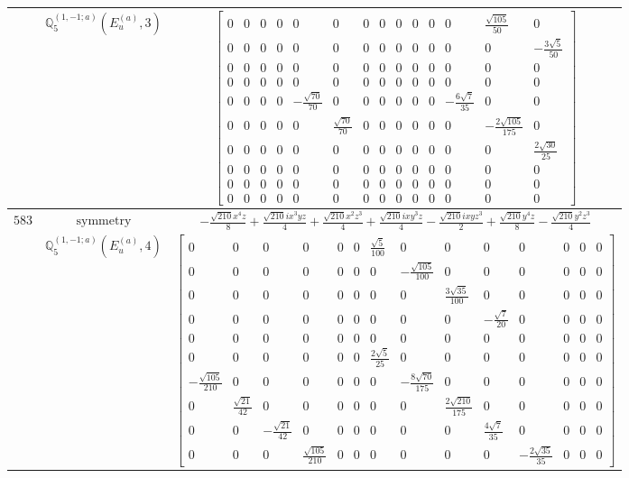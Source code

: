 \documentclass[fleqn,8pt,landscape]{jsarticle}
\begin{document}
\begin{longtable}{ccc}
$  $ & $ \mathbb{Q}_{5}^{(1,-1;a)}(E_{u}^{(a)},3) $ & $ \begin{bmatrix} 0 & 0 & 0 & 0 & 0 & 0 & 0 & 0 & 0 & 0 & 0 & 0 & \frac{\sqrt{105}}{50} & 0 \\ 0 & 0 & 0 & 0 & 0 & 0 & 0 & 0 & 0 & 0 & 0 & 0 & 0 & - \frac{3 \sqrt{5}}{50} \\ 0 & 0 & 0 & 0 & 0 & 0 & 0 & 0 & 0 & 0 & 0 & 0 & 0 & 0 \\ 0 & 0 & 0 & 0 & 0 & 0 & 0 & 0 & 0 & 0 & 0 & 0 & 0 & 0 \\ 0 & 0 & 0 & 0 & - \frac{\sqrt{70}}{70} & 0 & 0 & 0 & 0 & 0 & 0 & - \frac{6 \sqrt{7}}{35} & 0 & 0 \\ 0 & 0 & 0 & 0 & 0 & \frac{\sqrt{70}}{70} & 0 & 0 & 0 & 0 & 0 & 0 & - \frac{2 \sqrt{105}}{175} & 0 \\ 0 & 0 & 0 & 0 & 0 & 0 & 0 & 0 & 0 & 0 & 0 & 0 & 0 & \frac{2 \sqrt{30}}{25} \\ 0 & 0 & 0 & 0 & 0 & 0 & 0 & 0 & 0 & 0 & 0 & 0 & 0 & 0 \\ 0 & 0 & 0 & 0 & 0 & 0 & 0 & 0 & 0 & 0 & 0 & 0 & 0 & 0 \\ 0 & 0 & 0 & 0 & 0 & 0 & 0 & 0 & 0 & 0 & 0 & 0 & 0 & 0 \end{bmatrix} $ \\ \hline
$ 583 $ & $ \text{symmetry} $ & $ - \frac{\sqrt{210} x^{4} z}{8} + \frac{\sqrt{210} i x^{3} y z}{4} + \frac{\sqrt{210} x^{2} z^{3}}{4} + \frac{\sqrt{210} i x y^{3} z}{4} - \frac{\sqrt{210} i x y z^{3}}{2} + \frac{\sqrt{210} y^{4} z}{8} - \frac{\sqrt{210} y^{2} z^{3}}{4} $ \\
$  $ & $ \mathbb{Q}_{5}^{(1,-1;a)}(E_{u}^{(a)},4) $ & $ \begin{bmatrix} 0 & 0 & 0 & 0 & 0 & 0 & \frac{\sqrt{5}}{100} & 0 & 0 & 0 & 0 & 0 & 0 & 0 \\ 0 & 0 & 0 & 0 & 0 & 0 & 0 & - \frac{\sqrt{105}}{100} & 0 & 0 & 0 & 0 & 0 & 0 \\ 0 & 0 & 0 & 0 & 0 & 0 & 0 & 0 & \frac{3 \sqrt{35}}{100} & 0 & 0 & 0 & 0 & 0 \\ 0 & 0 & 0 & 0 & 0 & 0 & 0 & 0 & 0 & - \frac{\sqrt{7}}{20} & 0 & 0 & 0 & 0 \\ 0 & 0 & 0 & 0 & 0 & 0 & 0 & 0 & 0 & 0 & 0 & 0 & 0 & 0 \\ 0 & 0 & 0 & 0 & 0 & 0 & \frac{2 \sqrt{5}}{25} & 0 & 0 & 0 & 0 & 0 & 0 & 0 \\ - \frac{\sqrt{105}}{210} & 0 & 0 & 0 & 0 & 0 & 0 & - \frac{8 \sqrt{70}}{175} & 0 & 0 & 0 & 0 & 0 & 0 \\ 0 & \frac{\sqrt{21}}{42} & 0 & 0 & 0 & 0 & 0 & 0 & \frac{2 \sqrt{210}}{175} & 0 & 0 & 0 & 0 & 0 \\ 0 & 0 & - \frac{\sqrt{21}}{42} & 0 & 0 & 0 & 0 & 0 & 0 & \frac{4 \sqrt{7}}{35} & 0 & 0 & 0 & 0 \\ 0 & 0 & 0 & \frac{\sqrt{105}}{210} & 0 & 0 & 0 & 0 & 0 & 0 & - \frac{2 \sqrt{35}}{35} & 0 & 0 & 0 \end{bmatrix} $ \\ \hline

\end{longtable}
\end{document}
